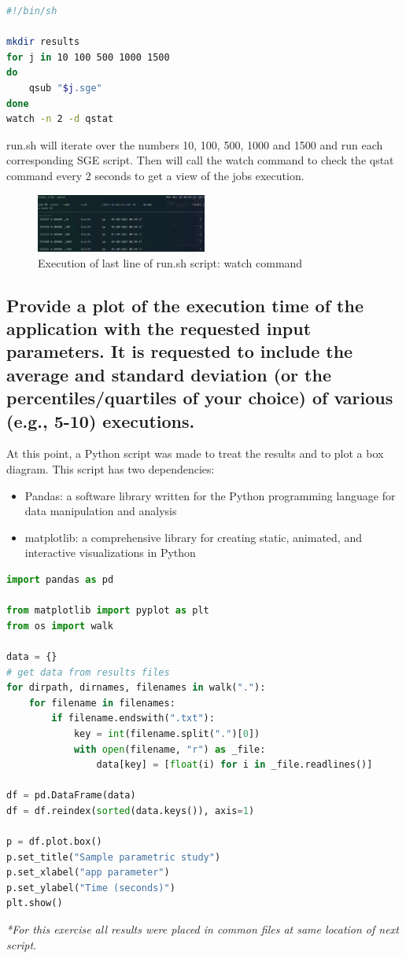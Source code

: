 \documentclass[11pt]{article}
\begin{document}
\begin{lstlisting}[language=bash, caption=Contents of run.sh script]
#!/bin/sh

mkdir results
for j in 10 100 500 1000 1500
do
	qsub "$j.sge"
done
watch -n 2 -d qstat

\end{lstlisting}

run.sh will iterate over the numbers 10, 100, 500, 1000 and 1500 and run each corresponding SGE script. Then will call the watch command to check the qstat command every 2 seconds to get a view of the jobs execution.

\begin{figure}[h]
\caption{Execution of last line of run.sh script: watch command}
\centering
\includegraphics[width=0.5\textwidth]{watch.png}
\end{figure}

\newpage

\hypertarget{12}{%
\subsection{Provide a plot of the execution time of the application with the requested input
parameters. It is requested to include the average and standard deviation (or the
percentiles/quartiles of your choice) of various (e.g., 5-10) executions.}\label{12}}

At this point, a Python script was made to treat the results and to plot a box diagram. This script has two dependencies:
\begin{itemize}
    \item Pandas: a software library written for the Python programming language for data manipulation and analysis
    \item matplotlib: a comprehensive library for creating static, animated, and interactive visualizations in Python
\end{itemize}
\begin{lstlisting}[language=python, caption=Python program to treat data results]
import pandas as pd

from matplotlib import pyplot as plt
from os import walk

data = {}
# get data from results files
for dirpath, dirnames, filenames in walk("."):
    for filename in filenames:
        if filename.endswith(".txt"):
            key = int(filename.split(".")[0])
            with open(filename, "r") as _file:
                data[key] = [float(i) for i in _file.readlines()]

df = pd.DataFrame(data)
df = df.reindex(sorted(data.keys()), axis=1)

p = df.plot.box()
p.set_title("Sample parametric study")
p.set_xlabel("app parameter")
p.set_ylabel("Time (seconds)")
plt.show()
\end{lstlisting}
\textit{*For this exercise all results were placed in common files at same location of next script}.
\end{document}
